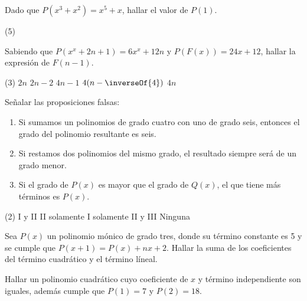 \begin{multicols}{2}
    \begin{exercise}
        Dado que $P(x^3 + x^2) = x^5 + x$, hallar el valor de $P(1)$.
        \begin{tasks}[label=\Alph*)](5)
        \end{tasks}
    \end{exercise}

    \begin{exercise}
        Sabiendo que $P(x^x + 2n + 1) = 6x^x + 12n$ y $P\left(F(x)\right) = 24x + 12$, hallar la expresión de $F(n - 1)$.
        \begin{tasks}[label=\Alph*)](3)
        \task $2n$
        \task $2n - 2$
        \task $4n - 1$
        \task $4(n - \inverseOf{4})$
        \task $4n$
        \end{tasks}
    \end{exercise}

    \begin{exercise}
        Señalar las proposiciones falsas:
        \begin{enumerate}[label=\Roman*.]
            \item Si sumamos un polinomios de grado cuatro con uno de grado seis, entonces el grado del polinomio resultante es seis.
            \item Si restamos dos polinomios del mismo grado, el resultado siempre será de un grado menor.
            \item Si el grado de $P(x)$ es mayor que el grado de $Q(x)$, el que tiene más términos es $P(x)$.
        \end{enumerate}
        \begin{tasks}(2)
            \task I y II
            \task II solamente
            \task I solamente
            \task II y III
            \task Ninguna
        \end{tasks}
    \end{exercise}

    \begin{problem}
        Sea $P(x)$ un polinomio mónico de grado tres, donde su término constante es 5 y se cumple que $P(x + 1) = P(x) + nx + 2$.
        Hallar la suma de los coeficientes del término cuadrático y el término líneal.
    \end{problem}

    \begin{problem}
        Hallar un polinomio cuadrático cuyo coeficiente de $x$ y término independiente son iguales, además cumple que $P(1) = 7$ y $P(2) = 18$.
    \end{problem}


\end{multicols}
